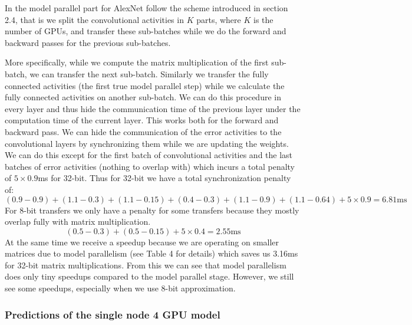 \documentclass{article} %
\begin{document}
In the model parallel part for AlexNet follow the scheme introduced in section 2.4, that is we split the convolutional activities in $K$ parts, where $K$ is the number of GPUs, and transfer these sub-batches while we do the forward and backward passes for the previous sub-batches.

More specifically, while we compute the matrix multiplication of the first sub-batch, we can transfer the next sub-batch. Similarly we transfer the fully connected activities (the first true model parallel step) while we calculate the fully connected activities on another sub-batch. We can do this procedure in every layer and thus hide the communication time of the previous layer under the computation time of the current layer. This works both for the forward and backward pass. We can hide the communication of the error activities to the convolutional layers by synchronizing them while we are updating the weights. We can do this except for the first batch of convolutional activities and the last batches of error activities (nothing to overlap with) which incurs a total penalty of $5\times 0.9$ms for 32-bit. Thus for 32-bit we have a total synchronization penalty of:
 \[ (0.9-0.9) + (1.1-0.3) + (1.1-0.15) + (0.4-0.3) + (1.1 - 0.9) + (1.1-0.64) + 5\times 0.9 = 6.81\mbox{ms} \] 
For 8-bit transfers we only have a penalty for some transfers because they mostly overlap fully with matrix multiplication.
 \[ (0.5-0.3) + (0.5-0.15) + 5\times 0.4   = 2.55\mbox{ms} \] 
At the same time we receive a speedup because we are operating on smaller matrices due to model parallelism (see Table 4 for details) which saves us 3.16ms for 32-bit matrix multiplications. From this we can see that model parallelism does only tiny speedups compared to the model parallel stage. However, we still see some speedups, especially when we use 8-bit approximation.

\subsubsection{Predictions of the single node 4 GPU model}
\end{document}
